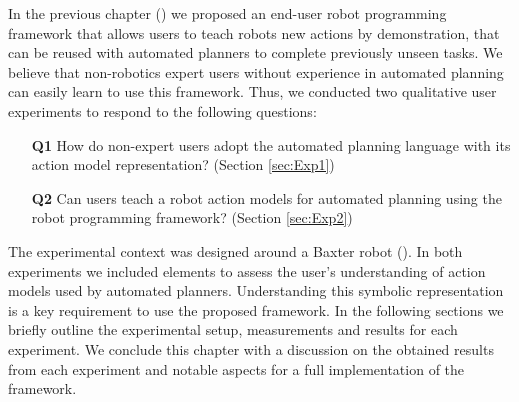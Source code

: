 
\label{sec:hypotheses}

In the previous chapter () we proposed an end-user robot programming framework that allows users to teach robots new actions by demonstration, that can be reused with automated planners to complete previously unseen tasks.
We believe that non-robotics expert users without experience in automated planning can easily learn to use this framework.
Thus, %
we conducted two qualitative user experiments to respond to the following questions:
\begin{enumerate}
  \item[\textbf{Q1}] How do non-expert users adopt the automated planning language with its action model representation? (Section \ref{sec:Exp1})
  \item[\textbf{Q2}] Can users teach a robot action models for automated planning using the robot programming framework? (Section \ref{sec:Exp2})
\end{enumerate}

The experimental context was designed around a Baxter robot ().
In both experiments we included elements to assess the user's understanding of action models used by automated planners.
Understanding this symbolic representation is a key requirement to use the proposed framework.
In the following sections we briefly outline the experimental setup, measurements and results for each experiment.
We conclude this chapter with a discussion on the obtained results from each experiment and notable aspects for a full implementation of the framework.
 
